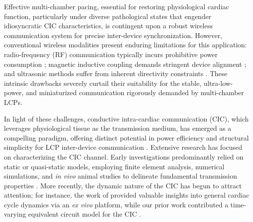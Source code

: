 \documentclass[journal]{IEEEtran}
\begin{document}
Effective multi-chamber pacing, essential for restoring physiological cardiac function, particularly under diverse pathological states that engender idiosyncratic CIC characteristics, is contingent upon a robust wireless communication system for precise inter-device synchronization. However, conventional wireless modalities present enduring limitations for this application: radio-frequency (RF) communication typically incurs prohibitive power consumption \cite{bose2018rf}; magnetic inductive coupling demands stringent device alignment \cite{li2018200mb, Islam2021Performance}; and ultrasonic methods suffer from inherent directivity constraints \cite{seyedi2013survey}. These intrinsic drawbacks severely curtail their suitability for the stable, ultra-low-power, and miniaturized communication rigorously demanded by multi-chamber LCPs.

In light of these challenges, conductive intra-cardiac communication (CIC), which leverages physiological tissue as the transmission medium, has emerged as a compelling paradigm, offering distinct potential in power efficiency and structural simplicity for LCP inter-device communication \cite{wu2020equivalent, opie2004heart, Khaleghi2020ConductiveImpulse, Wegmueller2010Signal, Teshome2016Galvanically}. Extensive research has focused on characterizing the CIC channel. Early investigations predominantly relied on static or quasi-static models, employing finite element analysis, numerical simulations, and \textit{in vivo} animal studies to delineate fundamental transmission properties \cite{bereuter2019leadless_sync, bereuter2018fundamental, Khaleghi2021Conductive_numerical, Maldari2020Frequency}. More recently, the dynamic nature of the CIC has begun to attract attention; for instance, the work of \cite{LiChen2023Investigation} provided valuable insights into general cardiac cycle dynamics via an \textit{ex vivo} platform, while our prior work contributed a time-varying equivalent circuit model for the CIC \cite{zilaingwei2024Time_varing_model_placeholder}.
\end{document}
